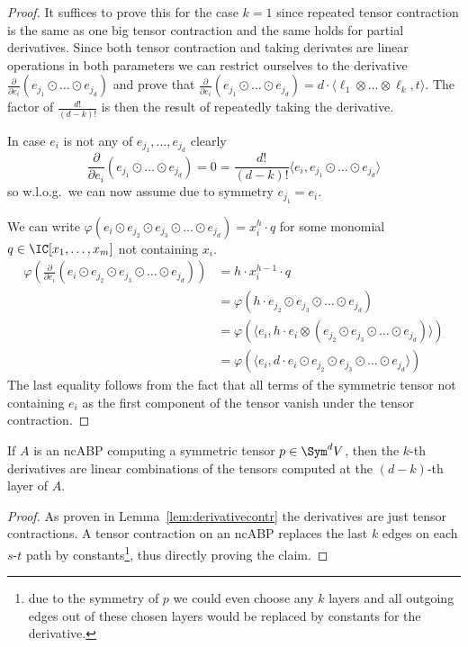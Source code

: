 \begin{proof}
    It suffices to prove this for the case $k=1$ since repeated tensor contraction is the same as one big tensor contraction and the same holds for partial derivatives.
    Since both tensor contraction and taking derivates are linear operations in both parameters we can restrict ourselves to the derivative $\frac{\partial}{\partial e_i}(e_{j_1} \odot \dots \odot e_{j_d})$ and prove that $\frac{\partial}{\partial e_i}(e_{j_1} \odot \dots \odot e_{j_d}) = d \cdot \langle \ell_1 \otimes \dots \otimes \ell_k, t \rangle$.
    The factor of $\frac{d!}{(d-k)!}$ is then the result of repeatedly taking the derivative.

    In case $e_i$ is not any of $e_{j_1}, \dots, e_{j_d}$ clearly
    \[
        \frac{\partial}{\partial e_i}(e_{j_1} \odot \dots \odot e_{j_d}) = 0 = \frac{d!}{(d-k)!} \langle e_i, e_{j_1} \odot \dots \odot e_{j_d} \rangle
    \]
    so w.l.o.g.\ we can now assume due to symmetry $e_{j_1} = e_i$.

    We can write $\varphi\left(e_i \odot e_{j_2} \odot e_{j_3} \odot \dots \odot e_{j_d}\right) = x_i^h \cdot q$ for some monomial $q \in \IC[x_1, \dots,x_m]$ not containing $x_i$.
    \begin{align*}
        \varphi\left(\frac{\partial}{\partial e_i}\left(e_i \odot e_{j_2} \odot e_{j_3} \odot \dots \odot e_{j_d}\right)\right)
        &= h \cdot x_i^{h-1} \cdot q\\
        &= \varphi\left(h \cdot e_{j_2} \odot e_{j_3} \odot \dots \odot e_{j_d}\right)\\
        &= \varphi\left(\langle e_i, h \cdot e_i \otimes (e_{j_2} \odot e_{j_3} \odot \dots \odot e_{j_d})\rangle\right)\\
        &= \varphi\left(\langle e_i, d \cdot e_i \odot e_{j_2} \odot e_{j_3} \odot \dots \odot e_{j_d}\rangle\right)
    \end{align*}
    The last equality follows from the fact that all terms of the symmetric tensor not containing $e_i$ as the first component of the tensor vanish under the tensor contraction.
\end{proof}

\begin{lemma}
    \label{lem:derivativeabps}
    If $A$ is an ncABP computing a symmetric tensor $p \in \Sym^d V$, then the $k$-th derivatives are linear combinations of the tensors computed at the $(d-k)$-th layer of $A$.
\end{lemma}
\begin{proof}
    As proven in Lemma~\ref{lem:derivativecontr} the derivatives are just tensor contractions. A tensor contraction on an ncABP replaces the last $k$ edges on each $s$-$t$ path by constants\footnote{due to the symmetry of $p$ we could even choose any $k$ layers and all outgoing edges out of these chosen layers would be replaced by constants for the derivative.}, thus directly proving the claim.
\end{proof}

